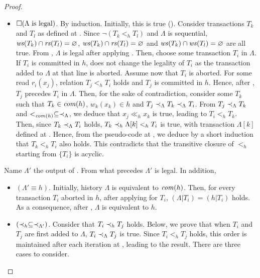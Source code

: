 \begin{proof}
\begin{itemize}
  \item $\tlGlobally(\Lambda\text{ is legal})$.
    By induction.
    Initially, this is true ().
    Consider transactions $T_k$ and $T_l$ as defined at .
    Since $\neg (T_k <_h T_l)$ and $\Lambda$ is sequential, $\writeSetOf{T_k} \inter \readSetOf{T_l} = \emptySet$, $\writeSetOf{T_k} \inter \readSetOf{T_l} = \emptySet$ and $\writeSetOf{T_k} \inter \writeSetOf{T_l} = \emptySet$ are all true.
    From , $\Lambda$ is legal after applying .
    Then, choose some transaction $T_i$ in $\Lambda$.
    If $T_i$ is committed in $h$,  does not change the legality of $T_i$ as the transaction added to $\Lambda$ at that line is aborted.
    Assume now that $T_i$ is aborted.
    For some read $r_i(x_j)$, relation $T_j <_h T_i$ holds and $T_j$ is committed in $h$.
    Hence, after , $T_j$ precedes $T_i$ in $\Lambda$.
    Then, for the sake of contradiction, consider some $T_k$ such that $T_k \in \committed{h}$, $w_k(x_k) \in h$ and $T_j \hb_{\Lambda} T_k \hb_{\Lambda} T_i$.
    From $T_j \hb_{\Lambda} T_k$ and $<_{\committed{h}} \subseteq \hb_{\Lambda}$, we deduce that $x_j \ll_h x_k$ is true, leading to $T_i <_h T_k$.
    Then, since $T_k \hb_{\Lambda} T_i$ holds, $T_k \hb_h \Lambda[k] <_h T_i$ is true, with transaction $\Lambda[k]$ defined at .
    Hence, from the pseudo-code at , we deduce by a short induction that $T_k <_h T_i$ also holds.
    This contradicts that the transitive closure of $<_h$ starting from $\{T_i\}$ is acyclic.    
  \end{itemize}
  Name $\Lambda'$ the output of .
  From what precedes $\Lambda'$ is legal.
  In addition,
  \begin{itemize}
  \item $(\Lambda' \equiv h)$.
    Initially, history $\Lambda$ is equivalent to $\committed{h}$.
    Then, for every transaction $T_i$ aborted in $h$, after applying  for $T_i$, $(\Lambda|T_i) = (h|T_i)$ holds.
    As a consequence, after , $\Lambda$ is equivalent to $h$.
  \item $(\hb_h \subseteq \hb_{\Lambda'})$.
    Consider that $T_i \hb_h T_j$ holds.
    Below, we prove that when $T_i$ and $T_j$ are first added to $\Lambda$, $T_i \hb_{\Lambda} T_j$ is true.    
    Since $T_i <_h T_j$ holds, this order is maintained after each iteration at , leading to the result.
    There are three cases to consider.

\end{itemize}
\end{proof}
